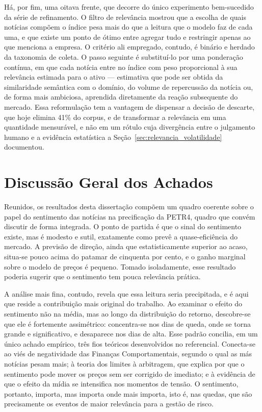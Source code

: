 Há, por fim, uma oitava frente, que decorre do único experimento bem-sucedido da série de refinamento. O filtro de relevância mostrou que a escolha de quais notícias compõem o índice pesa mais do que a leitura que o modelo faz de cada uma, e que existe um ponto de ótimo entre agregar tudo e restringir apenas ao que menciona a empresa. O critério ali empregado, contudo, é binário e herdado da taxonomia de coleta. O passo seguinte é substituí-lo por uma ponderação contínua, em que cada notícia entre no índice com peso proporcional à sua relevância estimada para o ativo --- estimativa que pode ser obtida da similaridade semântica com o domínio, do volume de repercussão da notícia ou, de forma mais ambiciosa, aprendida diretamente da reação subsequente do mercado. Essa reformulação tem a vantagem de dispensar a decisão de descarte, que hoje elimina 41\% do corpus, e de transformar a relevância em uma quantidade mensurável, e não em um rótulo cuja divergência entre o julgamento humano e a evidência estatística a Seção~\ref{sec:relevancia_volatilidade} documentou.

\section{Discussão Geral dos Achados}

Reunidos, os resultados desta dissertação compõem um quadro coerente sobre o papel do sentimento das notícias na precificação da PETR4, quadro que convém discutir de forma integrada. O ponto de partida é que o sinal do sentimento existe, mas é modesto e sutil, exatamente como prevê a quase-eficiência do mercado. A previsão de direção, ainda que estatisticamente superior ao acaso, situa-se pouco acima do patamar de cinquenta por cento, e o ganho marginal sobre o modelo de preços é pequeno. Tomado isoladamente, esse resultado poderia sugerir que o sentimento tem pouca relevância prática.

A análise mais fina, contudo, revela que essa leitura seria precipitada, e é aqui que reside a contribuição mais original do trabalho. Ao examinar o efeito do sentimento não na média, mas ao longo da distribuição do retorno, descobre-se que ele é fortemente assimétrico: concentra-se nos dias de queda, onde se torna grande e significativo, e desaparece nos dias de alta. Esse padrão concilia, em um único achado empírico, três fios teóricos desenvolvidos no referencial. Conecta-se ao viés de negatividade das Finanças Comportamentais, segundo o qual as más notícias pesam mais; à teoria dos limites à arbitragem, que explica por que o sentimento pode mover os preços sem ser corrigido de imediato; e à evidência de que o efeito da mídia se intensifica nos momentos de tensão. O sentimento, portanto, importa, mas importa onde mais importa, isto é, nas quedas, que são precisamente os eventos de maior relevância para a gestão de risco.


